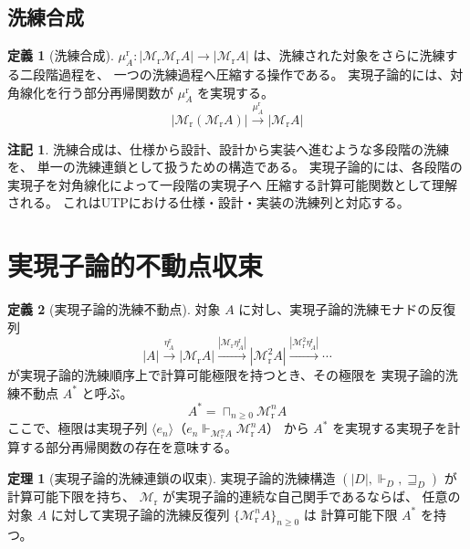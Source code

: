 \documentclass[11pt,a4paper]{article}
\theoremstyle{definition}
\newtheorem{definition}{定義}[section]
\newtheorem{theorem}{定理}[section]
\newtheorem{remark}{注記}[section]
\newcommand{\Mr}{\mathcal{M}_{\mathrm{r}}}
\newcommand{\etar}{\eta^{\mathrm{r}}}
\newcommand{\mur}{\mu^{\mathrm{r}}}
\DeclareMathOperator*{\bigsqcap}{\sqcap}
\newcommand{\Real}{\Vdash}
\begin{document}
\subsection{洗練合成}

\begin{definition}[洗練合成]
$\mur_A:|\Mr\Mr A|\to|\Mr A|$ は、洗練された対象をさらに洗練する二段階過程を、
一つの洗練過程へ圧縮する操作である。
実現子論的には、対角線化を行う部分再帰関数が $\mur_A$ を実現する。
\begin{equation}
|\Mr(\Mr A)| \xrightarrow{\mur_A} |\Mr A|
\end{equation}
\end{definition}

\begin{remark}
洗練合成は、仕様から設計、設計から実装へ進むような多段階の洗練を、
単一の洗練連鎖として扱うための構造である。
実現子論的には、各段階の実現子を対角線化によって一段階の実現子へ
圧縮する計算可能関数として理解される。
これはUTPにおける仕様・設計・実装の洗練列と対応する。
\end{remark}

\section{実現子論的不動点収束}

\begin{definition}[実現子論的洗練不動点]
対象 $A$ に対し、実現子論的洗練モナドの反復列
\begin{equation}
|A| \xrightarrow{\etar_A} |\Mr A| \xrightarrow{|\Mr\etar_A|} |\Mr^2 A|
\xrightarrow{|\Mr^2\etar_A|} \cdots
\end{equation}
が実現子論的洗練順序上で計算可能極限を持つとき、その極限を
実現子論的洗練不動点 $A^*$ と呼ぶ。
\begin{equation}
A^* = \bigsqcap_{n\geq 0}\Mr^n A
\end{equation}
ここで、極限は実現子列 $\langle e_n \rangle$（$e_n \Real_{\Mr^n A} \Mr^n A$）
から $A^*$ を実現する実現子を計算する部分再帰関数の存在を意味する。
\end{definition}

\begin{theorem}[実現子論的洗練連鎖の収束]
実現子論的洗練構造 $(|D|,\Real_D,\sqsupseteq_D)$ が計算可能下限を持ち、
$\Mr$ が実現子論的連続な自己関手であるならば、
任意の対象 $A$ に対して実現子論的洗練反復列 $\{\Mr^n A\}_{n\geq 0}$ は
計算可能下限 $A^*$ を持つ。
\end{theorem}
\end{document}
